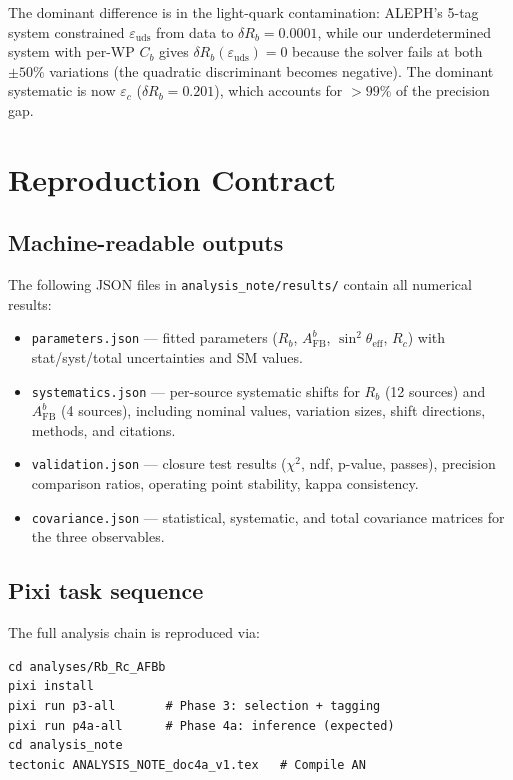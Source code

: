 \documentclass[11pt,a4paper]{article}
\begin{document}
The dominant difference is in the light-quark contamination: ALEPH's 5-tag system
constrained $\varepsilon_\mathrm{uds}$ from data to $\delta R_b = 0.0001$, while
our underdetermined system with per-WP $C_b$ gives $\delta R_b(\varepsilon_\mathrm{uds}) = 0$ because the solver fails at both $\pm 50\%$ variations (the quadratic discriminant becomes negative). The dominant systematic is now $\varepsilon_c$ ($\delta R_b = 0.201$), which accounts
for $> 99\%$ of the precision gap.

\section{Reproduction Contract}
\label{app:reproduction}

\subsection{Machine-readable outputs}

The following JSON files in \texttt{analysis\_note/results/} contain all numerical
results:

\begin{itemize}
\item \texttt{parameters.json} --- fitted parameters ($R_b$, $A_\mathrm{FB}^b$,
$\sin^2\theta_\mathrm{eff}$, $R_c$) with stat/syst/total uncertainties and SM values.
\item \texttt{systematics.json} --- per-source systematic shifts for $R_b$ (12 sources)
and $A_\mathrm{FB}^b$ (4 sources), including nominal values, variation sizes, shift
directions, methods, and citations.
\item \texttt{validation.json} --- closure test results ($\chi^2$, ndf, p-value, passes),
precision comparison ratios, operating point stability, kappa consistency.
\item \texttt{covariance.json} --- statistical, systematic, and total covariance matrices
for the three observables.
\end{itemize}

\subsection{Pixi task sequence}

The full analysis chain is reproduced via:
\begin{verbatim}
cd analyses/Rb_Rc_AFBb
pixi install
pixi run p3-all       # Phase 3: selection + tagging
pixi run p4a-all      # Phase 4a: inference (expected)
cd analysis_note
tectonic ANALYSIS_NOTE_doc4a_v1.tex   # Compile AN
\end{verbatim}
\end{document}
